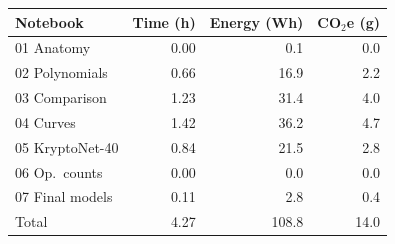 \begin{tabular}{lrrr}
\toprule
Notebook & Time (h) & Energy (Wh) & CO$_2$e (g) \\
\midrule
01 Anatomy & 0.00 & 0.1 & 0.0 \\
02 Polynomials & 0.66 & 16.9 & 2.2 \\
03 Comparison & 1.23 & 31.4 & 4.0 \\
04 Curves & 1.42 & 36.2 & 4.7 \\
05 KryptoNet-40 & 0.84 & 21.5 & 2.8 \\
06 Op.\ counts & 0.00 & 0.0 & 0.0 \\
07 Final models & 0.11 & 2.8 & 0.4 \\
\midrule
Total & 4.27 & 108.8 & 14.0 \\
\bottomrule
\end{tabular}
